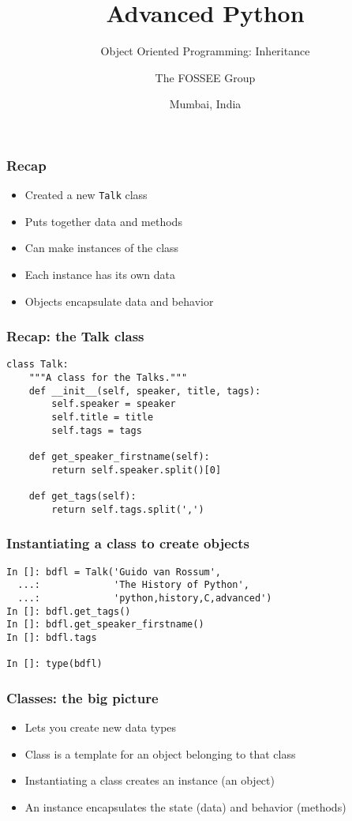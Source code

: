 \documentclass[14pt,compress,aspectratio=169]{beamer}
\title[OOP Inheritance]{Advanced Python}
\subtitle{Object Oriented Programming: Inheritance}
\author[FOSSEE] {The FOSSEE Group}
\institute[IIT Bombay] {Department of Aerospace Engineering\\IIT Bombay}
\date[] {Mumbai, India}
\begin{document}
\begin{frame}
  \titlepage
\end{frame}

\begin{frame}
  \frametitle{Recap}
  \begin{itemize}
  \item Created a new \lstinline{Talk} class
  \item Puts together data and methods
  \item Can make instances of the class
  \item Each instance has its own data
  \item Objects encapsulate data and behavior
  \end{itemize}
\end{frame}

\begin{frame}
  \frametitle{Recap: the Talk class}
  \vspace*{-0.1in}
  \begin{lstlisting}
class Talk:
    """A class for the Talks."""
    def __init__(self, speaker, title, tags):
        self.speaker = speaker
        self.title = title
        self.tags = tags

    def get_speaker_firstname(self):
        return self.speaker.split()[0]

    def get_tags(self):
        return self.tags.split(',')
  \end{lstlisting}
\end{frame}

\begin{frame}[fragile]
  \frametitle{Instantiating a class to create objects}
  \begin{lstlisting}
In []: bdfl = Talk('Guido van Rossum',
  ...:             'The History of Python',
  ...:             'python,history,C,advanced')
In []: bdfl.get_tags()
In []: bdfl.get_speaker_firstname()
In []: bdfl.tags

In []: type(bdfl)
  \end{lstlisting}
\end{frame}


\begin{frame}[fragile]
  \frametitle{Classes: the big picture}
  \begin{itemize}
  \item Lets you create new data types
  \item Class is a template for an object belonging to that class
  \item Instantiating a class creates an instance (an object)
  \item An instance encapsulates the state (data) and behavior
    (methods)
  \end{itemize}
\end{frame}
\end{document}
